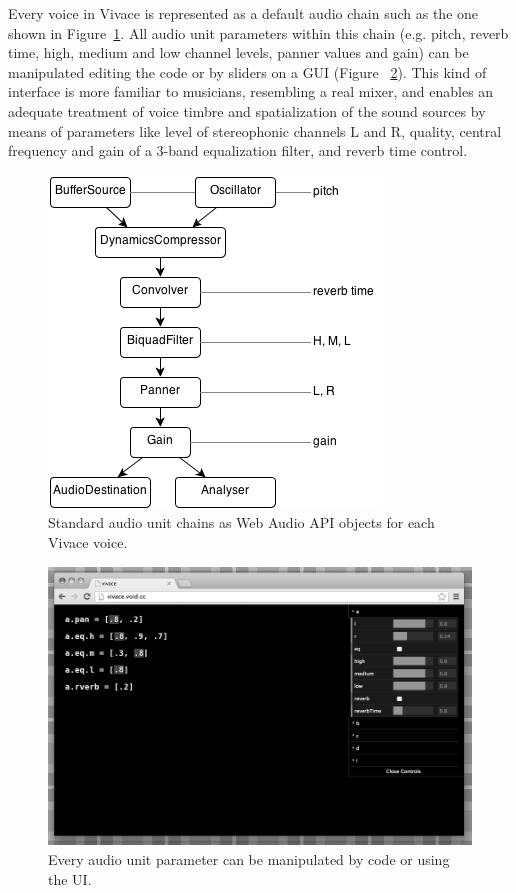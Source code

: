 \documentclass[12pt,times,twocolumn]{article}
\begin{document}
Every voice in Vivace is represented as a default audio chain such as
the one shown in Figure~\ref{fig:chain}. All audio unit parameters
within this chain (e.g. pitch, reverb time, high, medium and low
channel levels, panner values and gain) can be manipulated editing the
code or by sliders on a GUI (Figure ~\ref{fig:ui}). This kind of
interface is more familiar to musicians, resembling a real mixer, and
enables an adequate treatment of voice timbre and spatialization of
the sound sources by means of parameters like level of stereophonic
channels L and R, quality, central frequency and gain of a 3-band
equalization filter, and reverb time control.

\begin{figure}[htpb]
  \begin{center}
    \includegraphics[scale=.5]{img/fig_chain_.png}
    \caption{Standard audio unit chains as Web Audio API objects for
      each Vivace voice.}
    \label{fig:chain}
  \end{center}
\end{figure}

\begin{figure}[htpb]
  \begin{center}
    \includegraphics[scale=.4]{img/fig_ui_.png}
    \caption{Every audio unit parameter can be manipulated by code or
      using the UI.}
    \label{fig:ui}
  \end{center}
\end{figure}
\end{document}
